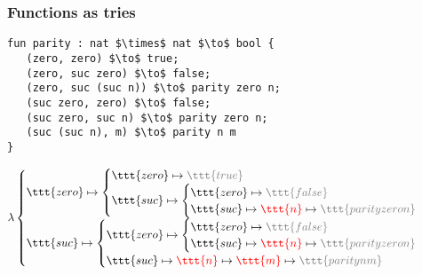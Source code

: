 \begin{frame}[fragile]
\frametitle{Functions as tries}
\begin{lstlisting}[escapechar=&,basicstyle=\ttfamily\linespread{1}\footnotesize]
fun parity : nat $\times$ nat $\to$ bool {
   (zero, zero) $\to$ true;
   (zero, suc zero) $\to$ false;
   (zero, suc (suc n)) $\to$ parity zero n;
   (suc zero, zero) $\to$ false;
   (suc zero, suc n) $\to$ parity zero n;
   (suc (suc n), m) $\to$ parity n m
}
\end{lstlisting}
\pause
\[
\lambda
\begin{cases}
\ttt{zero} \mapsto
\begin{cases}
\ttt{zero} \mapsto \textcolor{gray}{\ttt{true}}
\\
\ttt{suc} \mapsto
\begin{cases}
\ttt{zero} \mapsto \textcolor{gray}{\ttt{false}}
\\
\ttt{suc} \mapsto \Zap{\ttt{n}} \mapsto \textcolor{gray}{\ttt{parity zero n}}
\end{cases}
\end{cases}
\\
\ttt{suc} \mapsto
\begin{cases}
\ttt{zero} \mapsto
\begin{cases}
\ttt{zero} \mapsto \textcolor{gray}{\ttt{false}}
\\
\ttt{suc} \mapsto \Zap{\ttt{n}} \mapsto \textcolor{gray}{\ttt{parity zero n}}
\end{cases}
\\
\ttt{suc} \mapsto \Zap{\ttt{n}} \mapsto \Zap{\ttt{m}} \mapsto \textcolor{gray}{\ttt{parity n m}}
\end{cases}
\end{cases}
\]
\end{frame}
